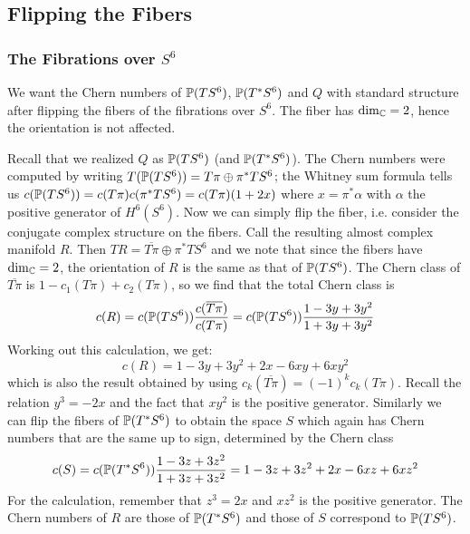 \documentclass{scrartcl}
\begin{document}
\subsection{Flipping the Fibers}

\subsubsection{The Fibrations over $S^6$}

We want the Chern numbers of $\P(TS^6)$, $\P(T^*S^6)$ and $Q$ with standard structure after flipping the fibers of the fibrations over $S^6$. The fiber has $\dim_\C=2$, hence the orientation is not affected.

\medskip

Recall that we realized $Q$ as $\P(TS^6)$ (and $\P(T^*S^6)$). The Chern numbers were computed by writing $T(\P(TS^6))=T\pi\oplus \pi^*TS^6$; the Whitney sum formula tells us $c(\P(TS^6))=c(T\pi)c(\pi^*TS^6)=c(T\pi)(1+2x)$ where $x=\pi^*\alpha$ with $\alpha$ the positive generator of $H^6(S^6)$. Now we can simply flip the fiber, i.e. consider the conjugate complex structure on the fibers. Call the resulting almost complex manifold $R$. Then $TR=\overline{T\pi}\oplus \pi^*TS^6$ and we note that since the fibers have $\dim_\C=2$, the orientation of $R$ is the same as that of $\P(TS^6)$. The Chern class of $\overline{T\pi}$ is $1-c_1(T\pi)+c_2(T\pi)$, so we find that the total Chern class is
\begin{equation*}
	c(R)=c(\P(TS^6))\frac{c(\overline{T\pi})}{c(T\pi)}
	=c(\P(TS^6))\frac{1-3y+3y^2}{1+3y+3y^2}
\end{equation*}
Working out this calculation, we get:
\begin{equation*}
	c(R)=1-3y+3y^2+2x-6xy+6xy^2
\end{equation*}
which is also the result obtained by using $c_k(\overline{T\pi})=(-1)^kc_k(T\pi)$. Recall the relation $y^3=-2x$ and the fact that $xy^2$ is the positive generator. Similarly we can flip the fibers of $\P(T^*S^6)$ to obtain the space $S$ which again has Chern numbers that are the same up to sign, determined by the Chern class
\begin{equation*}
	c(S)=c(\P(T^*S^6))\frac{1-3z+3z^2}{1+3z+3z^2}
	=1-3z+3z^2+2x-6xz+6xz^2
\end{equation*}
For the calculation, remember that $z^3=2x$ and $xz^2$ is the positive generator. The Chern numbers of $R$ are those of $\P(T^*S^6)$ and those of $S$ correspond to $\P(TS^6)$.

\medskip
\end{document}

